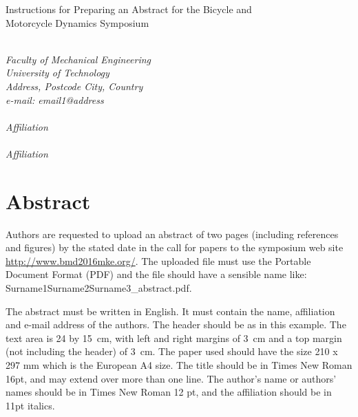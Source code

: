 \documentclass{bmd2016a}
\begin{document}
\begin{flushleft}
{\fontsize{16pt}{20pt}\selectfont%
  Instructions for Preparing an Abstract for the Bicycle and\\}
{\fontsize{16pt}{20pt}\selectfont%
  Motorcycle Dynamics Symposium\\}
\end{flushleft}

\begin{flushleft}
  {\\}
  \textit{Faculty of Mechanical Engineering\\
          University of Technology\\
          Address, Postcode City, Country\\
          e-mail: email1@address
}\vspace{10pt}\\
  {\\}
  \textit{Affiliation}\vspace{10pt}\\
  {\\}
  \textit{Affiliation}\vspace{10pt}\\
\end{flushleft}

\section*{Abstract}
Authors are requested to upload an abstract of two pages (including references
and figures) by the stated date in the call for papers to the symposium web
site \url{http://www.bmd2016mke.org/}. The uploaded file must use the
Portable Document Format (PDF) and the file should have a sensible name like: Surname1Surname2Surname3\_abstract.pdf.

The abstract must be written in English. It must contain the name, affiliation
and e-mail address of the authors. The header should be as in
this example. The text area is 24 by 15~cm, with left and right margins of
3~cm and a top margin (not including the header) of 3~cm. The paper used should have the size 210 x 297 mm which is the European A4 size. The title should be
in Times New Roman 16pt, and may extend over more than one line. The author's
name or authors' names should be in Times New Roman 12 pt, and the affiliation
should be in 11pt italics.
\end{document}

